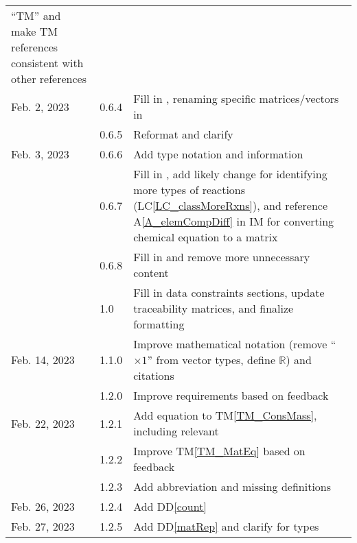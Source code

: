 \documentclass[12pt]{article}
\newcommand{\ddref}[1]{DD\ref{#1}}
\newcommand{\tmref}[1]{TM\ref{#1}}
\newcommand{\aref}[1]{A\ref{#1}}
\newcommand{\lcref}[1]{LC\ref{#1}}
\begin{document}
\begin{tabularx}{\textwidth}{p{2.5cm}p{1.5cm}X}
  ``TM'' and make TM references consistent with other references                                             \\
  Feb. 2, 2023        & 0.6.4         & Fill in \nameref{sec_refMat}, renaming specific matrices/vectors
  in \nameref{sec_instance}                                                                                  \\
                      & 0.6.5         & Reformat and clarify \nameref{sec_LCs}                               \\
  Feb. 3, 2023        & 0.6.6         & Add type notation and information                                    \\
                      & 0.6.7         & Fill in \nameref{sec_UCs}, add
  likely change for identifying
  more types of reactions (\lcref{LC_classMoreRxns}), and reference
  \aref{A_elemCompDiff} in IM for converting chemical equation to a matrix                                   \\
                      & 0.6.8         & Fill in \nameref{sec_traceMats} and remove more unnecessary content  \\
                      & 1.0           & Fill in data constraints sections, update traceability matrices, and
  finalize formatting                                                                                        \\
  Feb. 14, 2023       & 1.1.0         & Improve mathematical notation
  (remove ``$\times 1$'' from vector types, define $\mathbb{R}$) and citations                               \\
                      & 1.2.0         & Improve requirements based on feedback                               \\
  Feb. 22, 2023       & 1.2.1         & Add equation to \tmref{TM_ConsMass}, including relevant
  \nameref{sec_datatypes}                                                                                    \\
                      & 1.2.2         & Improve \tmref{TM_MatEq} based on feedback                           \\
                      & 1.2.3         & Add \progname{} abbreviation and missing definitions                 \\
  Feb. 26, 2023       & 1.2.4         & Add \ddref{count}                                                    \\
  Feb. 27, 2023       & 1.2.5         & Add \ddref{matRep} and clarify \nameref{sec_mathNot} for types       \\

\end{tabularx}
\end{document}
